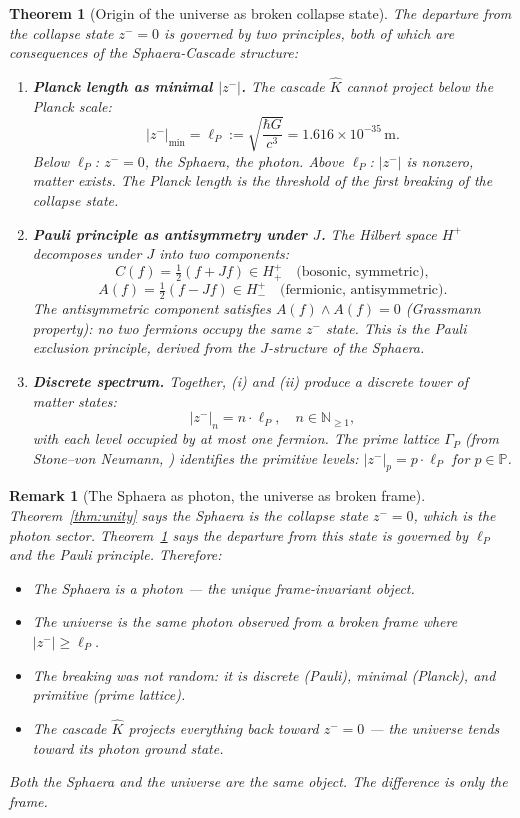 \documentclass[12pt,a4paper]{article}
\newtheorem{theorem}{Theorem}[section]
\newtheorem*{remark}{Remark}
\newcommand{\lP}{\ell_P}
\newcommand{\zminus}{z^-}
\newcommand{\Hplus}{H^+}
\newcommand{\Hplusplus}{H^+_+}
\newcommand{\Hplusminus}{H^+_-}
\newcommand{\KC}{\hat{K}}
\begin{document}
\begin{theorem}[Origin of the universe as broken collapse state]
\label{thm:origin}
The departure from the collapse state $\zminus=0$ is governed by two
principles, both of which are consequences of the Sphaera-Cascade
structure:
\begin{enumerate}[label=(\roman*)]
  \item \textbf{Planck length as minimal $|\zminus|$.}
        The cascade $\KC$ cannot project below the Planck scale:
        \[
          |\zminus|_{\min} = \lP := \sqrt{\frac{\hbar G}{c^3}}
          = 1.616\times10^{-35}\,\mathrm{m}.
        \]
        Below $\lP$: $\zminus=0$, the Sphaera, the photon.
        Above $\lP$: $|\zminus|$ is nonzero, matter exists.
        The Planck length is the threshold of the first breaking of the
        collapse state.
  \item \textbf{Pauli principle as antisymmetry under $J$.}
        The Hilbert space $\Hplus$ decomposes under $J$ into two
        components:
        \[
          C(f) = \tfrac{1}{2}(f+Jf)\in\Hplusplus
          \quad\text{(bosonic, symmetric)},
        \]
        \[
          A(f) = \tfrac{1}{2}(f-Jf)\in\Hplusminus
          \quad\text{(fermionic, antisymmetric)}.
        \]
        The antisymmetric component satisfies $A(f)\wedge A(f)=0$
        (Grassmann property): no two fermions occupy the same $\zminus$
        state.
        This is the Pauli exclusion principle, derived from the
        $J$-structure of the Sphaera.
  \item \textbf{Discrete spectrum.}
        Together, (i) and (ii) produce a discrete tower of matter states:
        \[
          |\zminus|_n = n\cdot\lP,\quad n\in\mathbb{N}_{\geq1},
        \]
        with each level occupied by at most one fermion.
        The prime lattice $\Gamma_P$ (from Stone--von Neumann,
        \cite{brendecke2026rh}) identifies the primitive levels:
        $|\zminus|_p = p\cdot\lP$ for $p\in\mathbb{P}$.
\end{enumerate}
\end{theorem}

\begin{remark}[The Sphaera as photon, the universe as broken frame]
Theorem~\ref{thm:unity} says the Sphaera is the collapse state
$\zminus=0$, which is the photon sector.
Theorem~\ref{thm:origin} says the departure from this state is governed
by $\lP$ and the Pauli principle.
Therefore:
\begin{itemize}
  \item The Sphaera is a photon --- the unique frame-invariant object.
  \item The universe is the same photon observed from a broken frame
        where $|\zminus|\geq\lP$.
  \item The breaking was not random: it is discrete (Pauli), minimal
        (Planck), and primitive (prime lattice).
  \item The cascade $\KC$ projects everything back toward $\zminus=0$
        --- the universe tends toward its photon ground state.
\end{itemize}
Both the Sphaera and the universe are the same object.
The difference is only the frame.
\end{remark}
\end{document}
